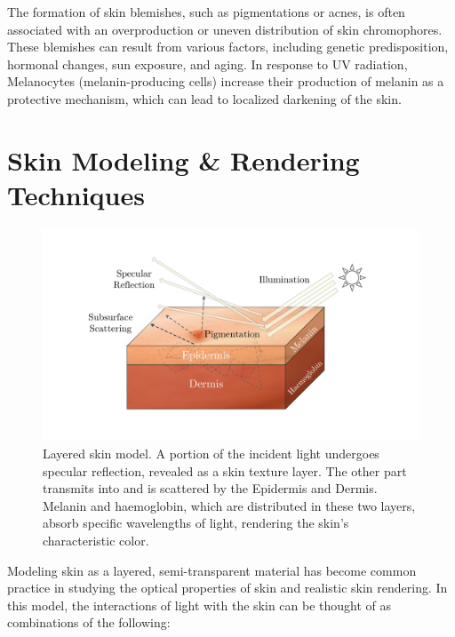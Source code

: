 \begin{spacing}{1.5}
The formation of skin blemishes, such as pigmentations or acnes, is often associated with an overproduction or uneven distribution of skin chromophores. These blemishes can result from various factors, including genetic predisposition, hormonal changes, sun exposure, and aging. In response to UV radiation, Melanocytes (melanin-producing cells) increase their production of melanin as a protective mechanism, which can lead to localized darkening of the skin.

\section{Skin Modeling \& Rendering Techniques}

\begin{figure}[t]
    \centering
    \includegraphics[width=\columnwidth]{Chapter2/skin_model2.pdf}
    \caption{Layered skin model. A portion of the incident light undergoes specular reflection, revealed as a skin texture layer. The other part transmits into and is scattered by the Epidermis and Dermis. Melanin and haemoglobin, which are distributed in these two layers, absorb specific wavelengths of light, rendering the skin's characteristic color.}
    \label{fig:skin_model}
\end{figure}

Modeling skin as a layered, semi-transparent material has become common practice in studying the optical properties of skin and realistic skin rendering\cite{10.5555/2383894.2383946}. In this model, the interactions of light with the skin can be thought of as combinations of the following:


\end{spacing}
